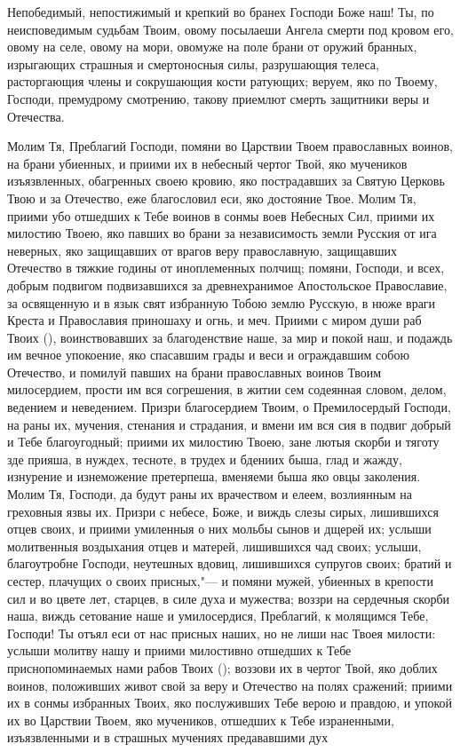 \begin{mymulticols}
 


Непобедимый, непостижимый и крепкий во бранех Господи Боже наш! Ты, по неисповедимым судьбам Твоим, овому посылаеши Ангела смерти под кровом его, овому на селе, овому на мори, овомуже на поле брани от оружий бранных, изрыгающих страшныя и смертоносныя силы, разрушающия телеса, расторгающия члены и сокрушающия кости ратующих; веруем, яко по Твоему, Господи, премудрому смотрению, такову приемлют смерть защитники веры и Отечества. 

Молим Тя, Преблагий Господи, помяни во Царствии Твоем православных воинов, на брани убиенных, и приими их в небесный чертог Твой, яко мучеников изъязвленных, обагренных своею кровию, яко пострадавших за Святую Церковь Твою и за Отечество, еже благословил еси, яко достояние Твое. Молим Тя, приими убо отшедших к Тебе воинов в сонмы воев Небесных Сил, приими их милостию Твоею, яко павших во брани за независимость земли Русския от ига неверных, яко защищавших от врагов веру православную, защищавших Отечество в тяжкие годины от иноплеменных полчищ; помяни, Господи, и всех, добрым подвигом подвизавшихся за древнехранимое Апостольское Православие, за освященную и в язык свят избранную Тобою землю Русскую, в нюже враги Креста и Православия приношаху и огнь, и меч. Приими с миром души раб Твоих (), воинствовавших за благоденствие наше, за мир и покой наш, и подаждь им вечное упокоение, яко спасавшим грады и веси и ограждавшим собою Отечество, и помилуй павших на брани православных воинов Твоим милосердием, прости им вся согрешения, в житии сем содеянная словом, делом, ведением и неведением. Призри благосердием Твоим, о Премилосердый Господи, на раны их, мучения, стенания и страдания, и вмени им вся сия в подвиг добрый и Тебе благоугодный; приими их милостию Твоею, зане лютыя скорби и тяготу зде прияша, в нуждех, тесноте, в трудех и бдениих быша, глад и жажду, изнурение и изнеможение претерпеша, вменяеми быша яко овцы заколения. Молим Тя, Господи, да будут раны их врачеством и елеем, возлиянным на греховныя язвы их. Призри с небесе, Боже, и виждь слезы сирых, лишившихся отцев своих, и приими умиленныя о них мольбы сынов и дщерей их; услыши молитвенныя воздыхания отцев и матерей, лишившихся чад своих; услыши, благоутробне Господи, неутешных вдовиц, лишившихся супругов своих; братий и сестер, плачущих о своих присных,"--- и помяни мужей, убиенных в крепости сил и во цвете лет, старцев, в силе духа и мужества; воззри на сердечныя скорби наша, виждь сетование наше и умилосердися, Преблагий, к молящимся Тебе, Господи! Ты отъял еси от нас присных наших, но не лиши нас Твоея милости: услыши молитву нашу и приими милостивно отшедших к Тебе приснопоминаемых нами рабов Твоих (); воззови их в чертог Твой, яко доблих воинов, положивших живот свой за веру и Отечество на полях сражений; приими их в сонмы избранных Твоих, яко послуживших Тебе верою и правдою, и упокой их во Царствии Твоем, яко мучеников, отшедших к Тебе израненными, изъязвленными и в страшных мучениях предававшими дух 
\end{mymulticols}
